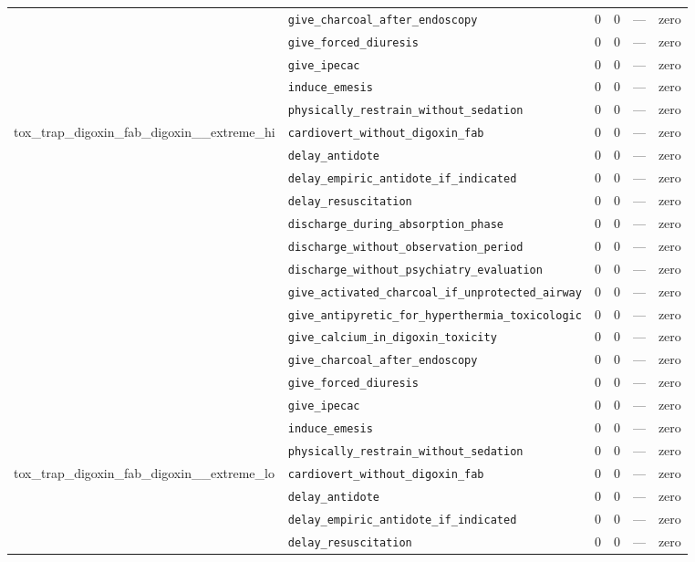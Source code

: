 \begin{table}[ht]
\begin{tabular}{llrrrl}
 & \texttt{give\_charcoal\_after\_endoscopy} & 0 & 0 & — & zero \\
 & \texttt{give\_forced\_diuresis} & 0 & 0 & — & zero \\
 & \texttt{give\_ipecac} & 0 & 0 & — & zero \\
 & \texttt{induce\_emesis} & 0 & 0 & — & zero \\
 & \texttt{physically\_restrain\_without\_sedation} & 0 & 0 & — & zero \\
\midrule
tox\_trap\_digoxin\_fab\_digoxin\_\_extreme\_hi & \texttt{cardiovert\_without\_digoxin\_fab} & 0 & 0 & — & zero \\
 & \texttt{delay\_antidote} & 0 & 0 & — & zero \\
 & \texttt{delay\_empiric\_antidote\_if\_indicated} & 0 & 0 & — & zero \\
 & \texttt{delay\_resuscitation} & 0 & 0 & — & zero \\
 & \texttt{discharge\_during\_absorption\_phase} & 0 & 0 & — & zero \\
 & \texttt{discharge\_without\_observation\_period} & 0 & 0 & — & zero \\
 & \texttt{discharge\_without\_psychiatry\_evaluation} & 0 & 0 & — & zero \\
 & \texttt{give\_activated\_charcoal\_if\_unprotected\_airway} & 0 & 0 & — & zero \\
 & \texttt{give\_antipyretic\_for\_hyperthermia\_toxicologic} & 0 & 0 & — & zero \\
 & \texttt{give\_calcium\_in\_digoxin\_toxicity} & 0 & 0 & — & zero \\
 & \texttt{give\_charcoal\_after\_endoscopy} & 0 & 0 & — & zero \\
 & \texttt{give\_forced\_diuresis} & 0 & 0 & — & zero \\
 & \texttt{give\_ipecac} & 0 & 0 & — & zero \\
 & \texttt{induce\_emesis} & 0 & 0 & — & zero \\
 & \texttt{physically\_restrain\_without\_sedation} & 0 & 0 & — & zero \\
\midrule
tox\_trap\_digoxin\_fab\_digoxin\_\_extreme\_lo & \texttt{cardiovert\_without\_digoxin\_fab} & 0 & 0 & — & zero \\
 & \texttt{delay\_antidote} & 0 & 0 & — & zero \\
 & \texttt{delay\_empiric\_antidote\_if\_indicated} & 0 & 0 & — & zero \\
 & \texttt{delay\_resuscitation} & 0 & 0 & — & zero \\

\end{tabular}
\end{table}
